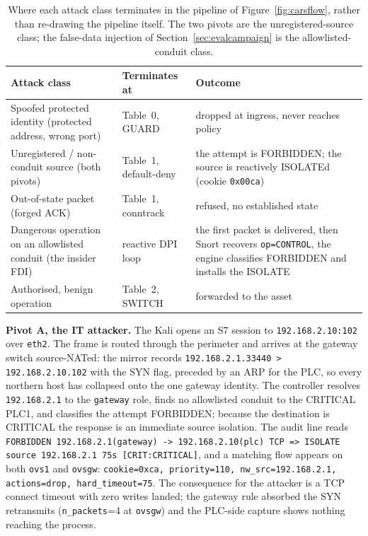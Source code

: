 \begin{table}[t]
\centering
\begin{tabular}{p{}p{}p{}}
\hline
Attack class & Terminates at & Outcome \\
\hline
Spoofed protected identity (protected address, wrong port) & Table~0, GUARD & dropped at ingress, never reaches policy \\
Unregistered / non-conduit source (both pivots) & Table~1, default-deny & the attempt is FORBIDDEN; the source is reactively ISOLATEd (cookie \texttt{0x00ca}) \\
Out-of-state packet (forged ACK) & Table~1, conntrack & refused, no established state \\
Dangerous operation on an allowlisted conduit (the insider FDI) & reactive DPI loop & the first packet is delivered, then Snort recovers \texttt{op=CONTROL}, the engine classifies FORBIDDEN and installs the ISOLATE \\
Authorised, benign operation & Table~2, SWITCH & forwarded to the asset \\
\hline
\end{tabular}
\caption[Where each attack class terminates]{Where each attack class terminates in the pipeline of Figure~\ref{fig:carsflow}, rather than re-drawing the pipeline itself. The two pivots are the unregistered-source class; the false-data injection of Section~\ref{sec:evalcampaign} is the allowlisted-conduit class.}
\label{tab:termination}
\end{table}

\textbf{Pivot A, the IT attacker.} The Kali opens an S7 session to \texttt{192.168.2.10:102} over \texttt{eth2}. The frame is routed through the perimeter and arrives at the gateway switch source-NATed: the mirror records \texttt{192.168.2.1.33440 > 192.168.2.10.102} with the SYN flag, preceded by an ARP for the PLC, so every northern host has collapsed onto the one gateway identity. The controller resolves \texttt{192.168.2.1} to the \texttt{gateway} role, finds no allowlisted conduit to the CRITICAL PLC1, and classifies the attempt FORBIDDEN; because the destination is CRITICAL the response is an immediate source isolation. The audit line reads \texttt{FORBIDDEN 192.168.2.1(gateway) -> 192.168.2.10(plc) TCP => ISOLATE source 192.168.2.1 75s [CRIT:CRITICAL]}, and a matching flow appears on both \texttt{ovs1} and \texttt{ovsgw}: \texttt{cookie=0xca, priority=110, nw\_src=192.168.2.1, actions=drop, hard\_timeout=75}. The consequence for the attacker is a TCP connect timeout with zero writes landed; the gateway rule absorbed the SYN retransmits (\texttt{n\_packets}=4 at \texttt{ovsgw}) and the PLC-side capture shows nothing reaching the process.

